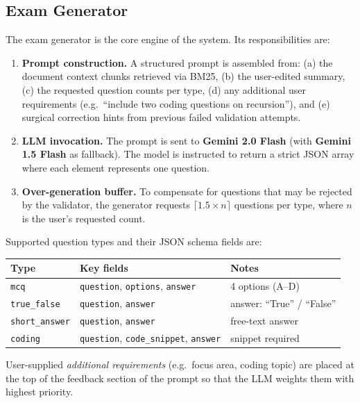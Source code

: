 \documentclass[12pt, a4paper]{article}
\begin{document}
\subsection{Exam Generator}

The exam generator is the core engine of the system. Its responsibilities are:

\begin{enumerate}[leftmargin=1.5em]
  \item \textbf{Prompt construction.} A structured prompt is assembled from: (a) the document context chunks retrieved via BM25, (b) the user-edited summary, (c) the requested question counts per type, (d) any additional user requirements (e.g.\ ``include two coding questions on recursion''), and (e) surgical correction hints from previous failed validation attempts.
  \item \textbf{LLM invocation.} The prompt is sent to \textbf{Gemini 2.0 Flash} (with \textbf{Gemini 1.5 Flash} as fallback). The model is instructed to return a strict JSON array where each element represents one question.
  \item \textbf{Over-generation buffer.} To compensate for questions that may be rejected by the validator, the generator requests $\lceil 1.5 \times n \rceil$ questions per type, where $n$ is the user's requested count.
\end{enumerate}

Supported question types and their JSON schema fields are:

\begin{center}
\begin{tabular}{lll}
  \toprule
  \textbf{Type} & \textbf{Key fields} & \textbf{Notes} \\
  \midrule
  \texttt{mcq}           & \texttt{question}, \texttt{options}, \texttt{answer}  & 4 options (A–D) \\
  \texttt{true\_false}   & \texttt{question}, \texttt{answer}                    & answer: ``True'' / ``False'' \\
  \texttt{short\_answer} & \texttt{question}, \texttt{answer}                    & free-text answer \\
  \texttt{coding}        & \texttt{question}, \texttt{code\_snippet}, \texttt{answer} & snippet required \\
  \bottomrule
\end{tabular}
\end{center}

User-supplied \textit{additional requirements} (e.g.\ focus area, coding topic) are placed at the top of the feedback section of the prompt so that the LLM weights them with highest priority.
\end{document}
